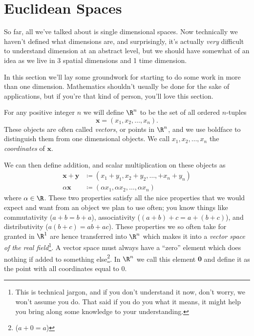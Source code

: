 \section{Euclidean Spaces}\label{sec:euclidean-spaces}

So far, all we've talked about is single dimensional spaces. Now technically we
haven't defined what dimensions are, and surprisingly, it's actually \emph{very}
difficult to understand dimension at an abstract level, but we should have
somewhat of an idea as we live in 3 spatial dimensions and 1 time dimension.

In this section we'll lay some groundwork for starting to do some work in more
than one dimension. Mathematics shouldn't usually be done for the sake of
applications, but if you're that kind of person, you'll love this section.

\begin{definition}\label{def:Rn}
    For any positive integer $n$ we will define $\R^n$ to be the set of all
    ordered $n$-tuples
    \begin{equation*}
        \mathbf{x} = \left(x_1, x_2, \ldots, x_n\right).
    \end{equation*}
    These objects are often called \emph{vectors}, or points in $\R^n$, and we
    use boldface to distinguish them from one dimensional objects. We call
    $x_1, x_2, \ldots, x_n$ the \emph{coordinates} of $\mathbf{x}$.
\end{definition}

We can then define addition, and scalar multiplication on these objects as
\begin{align}
    \mathbf{x} + \mathbf{y} & \coloneqq \left(x_1 + y_1, x_2 + y_2, \ldots, + x_n + y_n\right)  \\
    \alpha\mathbf{x}        & \coloneqq \left(\alpha x_1, \alpha x_2, \ldots, \alpha x_n\right)
\end{align}
where $\alpha\in\R$. These two properties satisfy all the nice properties that
we would expect and want from an object we plan to use often; you know things
like commutativity ($a + b = b + a$), associativity ($(a + b) + c = a + (b + c)$),
and distributivity ($a(b + c) = ab + ac$). These properties we so often take for
granted in $\R^1$ are hence transferred into $\R^n$ which makes it into a
\emph{vector space of the real field}\footnote{This is technical jargon, and if
    you don't understand it now, don't worry, we won't assume you do. That said if
    you do you what it means, it might help you bring along some knowledge to your
    understanding.}. A vector space must always have a ``zero'' element which does
nothing if added to something else\footnote{($a + 0 = a$)}. In $\R^n$ we call this
element $\mathbf{0}$ and define it as the point with all coordinates equal to 0.

